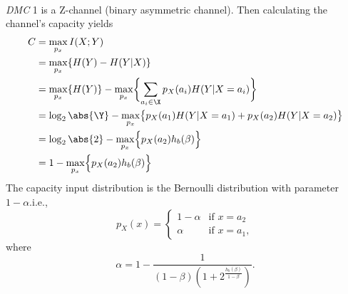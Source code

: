 \documentclass[
  coursecode={MTHE 474},
  assignmentname={Homework \homeworknumber},
  studentnumber=20053722,
  name={Bryan Hoang},
  draft,
]{
  ltxanswer%
}
\begin{document}
  \begin{questions}
    \setcounter{question}{\questionnumber}
    \addtocounter{question}{-1}
    \question[15]\
    \begin{parts}
      \part{}
      \begin{solution}
        \textit{DMC} 1 is a Z-channel (binary asymmetric channel). Then calculating the channel's capacity yields
        \begin{align*}
          C &= \max_{p_{x}} I(X;Y)                                                                                \\
            &= \max_{p_{x}} \{H(Y)-H(Y|X)\}                                                                       \\
            &= \max_{p_{x}} \{H(Y)\} - \max_{p_{x}}\biggl\{\sum_{a_{i}\in\X} p_{X}(a_{i}) H(Y|X=a_{i})\biggr\}    \\
            &= \log_{2} \abs{\Y} - \max_{p_{x}} \bigl\{p_{X}(a_{1})H(Y|X=a_{1}) + p_{X}(a_{2})H(Y|X=a_{2})\bigr\} \\
            &= \log_{2} \abs{2} - \max_{p_{x}} \Bigl\{p_{X}(a_{2})h_{b}(\beta)\Bigr\}                             \\
            &= 1 - \max_{p_{x}} \Bigl\{p_{X}(a_{2})h_{b}(\beta)\Bigr\}                                            \\
        \end{align*}
        The capacity input distribution is the Bernoulli distribution with parameter \(1-\alpha\).\@ i.e.,
        \begin{equation*}
          p_{X}(x) = \begin{cases}
            1-\alpha &\text{if } x = a_{2}  \\
            \alpha   &\text{if } x = a_{1},
          \end{cases}
        \end{equation*}
        where
        \begin{equation*}
          \alpha = 1 - \frac{1}{(1-\beta)(1+2^{\frac{h_{b}(\beta)}{1-\beta}})}.
        \end{equation*}
      \end{solution}

      \part{}
      \begin{solution}

      \end{solution}

      \part{}
      \begin{solution}

      \end{solution}
    \end{parts}
  \end{questions}
\end{document}
